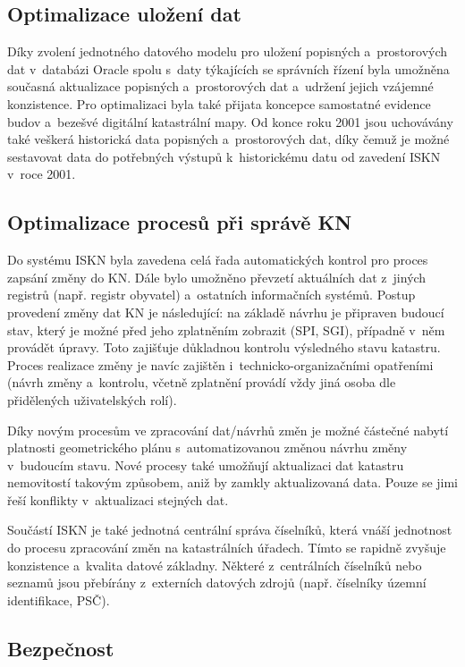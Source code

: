\documentclass[a4paper,12pt,oneside]{book}
\begin{document}
\subsection{Optimalizace uložení dat}

Díky zvolení jednotného datového modelu pro uložení popisných
a~prostorových dat v~databázi Oracle spolu s~daty týkajících se
správních řízení byla umožněna současná aktualizace popisných
a~prostorových dat a~udržení jejich vzájemné konzistence. Pro
optimalizaci byla také přijata koncepce samostatné evidence budov
a~bezešvé digitální katastrální mapy. Od konce roku 2001 jsou
uchovávány také veškerá historická data popisných a~prostorových dat,
díky čemuž je možné sestavovat data do potřebných výstupů
k~historickému datu od zavedení ISKN v~roce 2001. \cite{iskn}

\subsection{Optimalizace procesů při správě KN}

Do systému ISKN byla zavedena celá řada automatických kontrol pro
proces zapsání změny do KN. Dále bylo umožněno převzetí aktuálních dat
z~jiných registrů (např. registr obyvatel) a~ostatních informačních
systémů. Postup provedení změny dat KN je následující: na základě
návrhu je připraven budoucí stav, který je možné před jeho zplatněním
zobrazit (SPI, SGI), případně v~něm provádět úpravy. Toto zajišťuje
důkladnou kontrolu výsledného stavu katastru. Proces realizace změny
je navíc zajištěn i~technicko-organizačními opatřeními (návrh změny
a~kontrolu, včetně zplatnění provádí vždy jiná osoba dle přidělených
uživatelských rolí). \cite{iskn}

Díky novým procesům ve zpracování dat/návrhů změn je možné částečné
nabytí platnosti geometrického plánu s~automatizovanou změnou návrhu
změny v~budoucím stavu. Nové procesy také umožňují aktualizaci dat
katastru nemovitostí takovým způsobem, aniž by zamkly aktualizovaná
data. Pouze se jimi řeší konflikty v~aktualizaci stejných dat.

Součástí ISKN je také jednotná centrální správa číselníků, která vnáší
jednotnost do procesu zpracování změn na katastrálních úřadech. Tímto
se rapidně zvyšuje konzistence a~kvalita datové základny. Některé
z~centrálních číselníků nebo seznamů jsou přebírány z~externích
datových zdrojů (např. číselníky územní identifikace,
PSČ). \cite{iskn}

\subsection{Bezpečnost}
\end{document}
